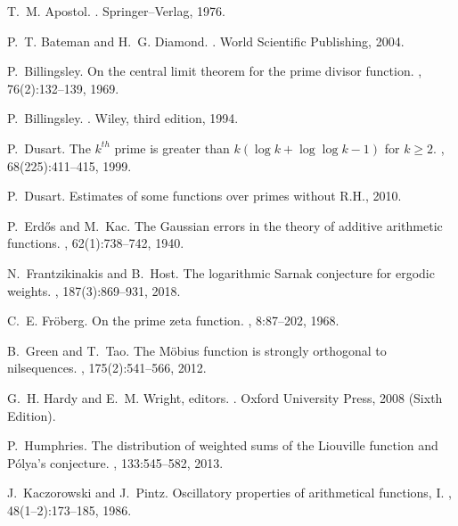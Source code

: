 \documentclass[11pt,reqno,a4letter]{article}
\numberwithin{equation}{section}
\numberwithin{figure}{section}
\numberwithin{table}{section}
\theoremstyle{plain}
\numberwithin{theorem}{section}
\theoremstyle{definition}
\begin{document}
\begin{thebibliography}{10}

T.~M. Apostol.
.
\newblock Springer--Verlag, 1976.

P.~T. Bateman and H.~G. Diamond.
.
\newblock World Scientific Publishing, 2004.

P.~Billingsley.
\newblock On the central limit theorem for the prime divisor function.
, 76(2):132--139, 1969.

P.~Billingsley.
.
\newblock Wiley, third edition, 1994.

P.~Dusart.
\newblock The $k^{th}$ prime is greater than $k(\log k +\log\log k-1)$ for $k
  \geq 2$.
, 68(225):411--415, 1999.

P.~Dusart.
\newblock Estimates of some functions over primes without {R}.{H}., 2010.

P.~Erd{\H{o}}s and M.~Kac.
\newblock The {G}aussian errors in the theory of additive arithmetic functions.
, 62(1):738--742, 1940.

N.~Frantzikinakis and B.~Host.
\newblock The logarithmic {S}arnak conjecture for ergodic weights.
, 187(3):869--931, 2018.

C.~E. Fr{\"{o}}berg.
\newblock On the prime zeta function.
, 8:87--202, 1968.

B.~Green and T.~Tao.
\newblock The {M}\"{o}bius function is strongly orthogonal to nilsequences.
, 175(2):541--566, 2012.

G.~H. Hardy and E.~M. Wright, editors.
.
\newblock Oxford University Press, 2008 (Sixth Edition).

P.~Humphries.
\newblock The distribution of weighted sums of the {L}iouville function and
  {P}\'{o}lya's conjecture.
, 133:545--582, 2013.

J.~Kaczorowski and J.~Pintz.
\newblock Oscillatory properties of arithmetical functions, {I}.
, 48(1--2):173--185, 1986.


\end{thebibliography}
\end{document}
